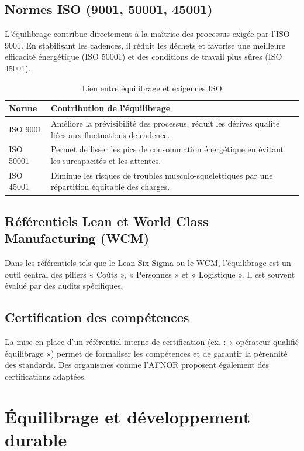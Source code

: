 \documentclass[12pt,a4paper]{article}
\begin{document}
\begin{center}
\subsection{Normes ISO (9001, 50001, 45001)}
L'équilibrage contribue directement à la maîtrise des processus exigée par l'ISO 9001. En stabilisant les cadences, il réduit les déchets et favorise une meilleure efficacité énergétique (ISO 50001) et des conditions de travail plus sûres (ISO 45001).

\begin{table}[H]
\centering
\caption{Lien entre équilibrage et exigences ISO}
\label{tab:iso}
\begin{tabular}{|l|p{8cm}|}
\hline
\textbf{Norme} & \textbf{Contribution de l'équilibrage} \\ \hline
ISO 9001 & Améliore la prévisibilité des processus, réduit les dérives qualité liées aux fluctuations de cadence. \\
ISO 50001 & Permet de lisser les pics de consommation énergétique en évitant les surcapacités et les attentes. \\
ISO 45001 & Diminue les risques de troubles musculo-squelettiques par une répartition équitable des charges. \\
\hline
\end{tabular}
\end{table}

\subsection{Référentiels Lean et World Class Manufacturing (WCM)}
Dans les référentiels tels que le Lean Six Sigma ou le WCM, l’équilibrage est un outil central des piliers « Coûts », « Personnes » et « Logistique ». Il est souvent évalué par des audits spécifiques.

\subsection{Certification des compétences}
La mise en place d’un référentiel interne de certification (ex. : « opérateur qualifié équilibrage ») permet de formaliser les compétences et de garantir la pérennité des standards. Des organismes comme l’AFNOR proposent également des certifications adaptées.

\section{Équilibrage et développement durable}


\end{center}
\end{document}
